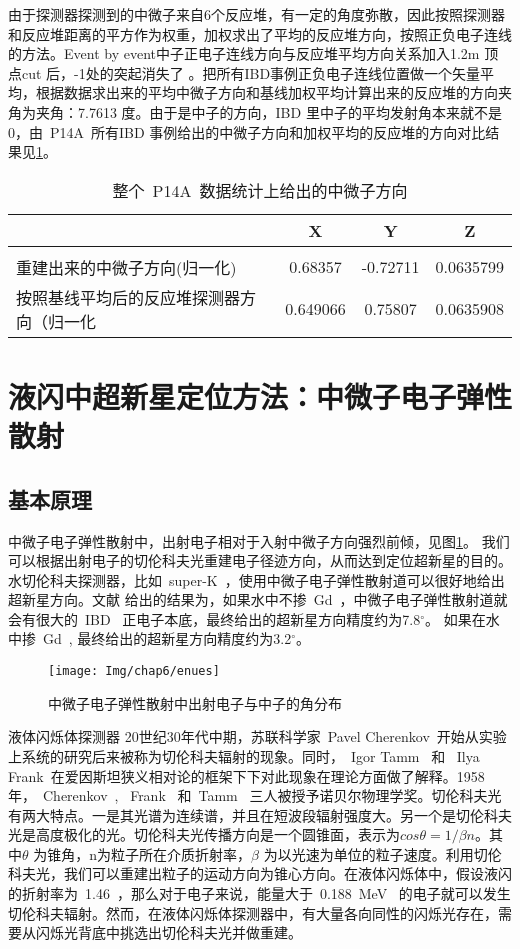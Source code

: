 由于探测器探测到的中微子来自6个反应堆，有一定的角度弥散，因此按照探测器和反应堆距离的平方作为权重，加权求出了平均的反应堆方向，按照正负电子连线的方法。Event by event中子正电子连线方向与反应堆平均方向关系加入1.2m 顶点cut 后，-1处的突起消失了 。把所有IBD事例正负电子连线位置做一个矢量平均，根据数据求出来的平均中微子方向和基线加权平均计算出来的反应堆的方向夹角为夹角：7.7613 度。由于是中子的方向，IBD 里中子的平均发射角本来就不是0，由~P14A~所有IBD 事例给出的中微子方向和加权平均的反应堆的方向对比结果见\ref{tab:t64}。
\begin{table}[htbp]
\centering  %
\begin{tabular}{lccc}  %
\hline
&X &Y&Z\\\hline
\\重建出来的中微子方向(归一化)&0.68357 & -0.72711&0.0635799
\\按照基线平均后的反应堆探测器方向（归一化&0.649066&0.75807&0.0635908
\\ \hline
\end{tabular}
\caption{整个~P14A~数据统计上给出的中微子方向}
\label{tab:t64}
\end{table}
\section{液闪中超新星定位方法：中微子电子弹性散射}
\subsection{基本原理}
中微子电子弹性散射中，出射电子相对于入射中微子方向强烈前倾，见图\ref{fig:enues}。 我们可以根据出射电子的切伦科夫光重建电子径迹方向，从而达到定位超新星的目的。水切伦科夫探测器，比如~super-K~，使用中微子电子弹性散射道可以很好地给出超新星方向。文献\citep{tomas2003supernova} 给出的结果为，如果水中不掺~Gd~，中微子电子弹性散射道就会有很大的~IBD~ 正电子本底，最终给出的超新星方向精度约为7.8$ ^\circ $。 如果在水中掺~Gd~, 最终给出的超新星方向精度约为3.2$^\circ $。
\begin{figure}[!htbp]
  \centering
   \texttt{[image: Img/chap6/enues]}
    \caption{中微子电子弹性散射中出射电子与中子的角分布}
  \label{fig:enues}
\end{figure}
液体闪烁体探测器
20世纪30年代中期，苏联科学家~Pavel Cherenkov~开始从实验上系统的研究后来被称为切伦科夫辐射的现象。同时，~Igor Tamm~ 和 ~Ilya Frank~在爱因斯坦狭义相对论的框架下下对此现象在理论方面做了解释。1958 年，~Cherenkov~, ~Frank~ 和~Tamm~ 三人被授予诺贝尔物理学奖。切伦科夫光有两大特点。一是其光谱为连续谱，并且在短波段辐射强度大。另一个是切伦科夫光是高度极化的光。切伦科夫光传播方向是一个圆锥面，表示为$cos\theta = 1/ \beta n $。其中$\theta$ 为锥角，n为粒子所在介质折射率，$\beta$ 为以光速为单位的粒子速度。利用切伦科夫光，我们可以重建出粒子的运动方向为锥心方向。在液体闪烁体中，假设液闪的折射率为~1.46~，那么对于电子来说，能量大于~0.188~MeV~ 的电子就可以发生切伦科夫辐射。然而，在液体闪烁体探测器中，有大量各向同性的闪烁光存在，需要从闪烁光背底中挑选出切伦科夫光并做重建。

